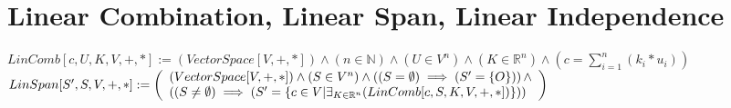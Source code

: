 \documentclass{book}
\newcommand{\abr}{:=}
\newcommand{\pipe}{$\phantom{(}\vrectangleblack\phantom{)}$}
\newcommand{\pr}[1]{\left(#1\right)}
\begin{document}
\begin{comment}
      \begin{enumerate}
        \lit $(a_1 \in A) \land (a_1 = -b_1 \in B)$ \pipe $a_1 \in A \cap B$ \pipe $a_1 = O = b_1$
        \lit $(a_2 \in A) \land (a_2 = -b_2 \in B)$ \pipe $a_2 \in A \cap B$ \pipe $a_2 = O = b_2$
        \lit $\langle a_1, b_1 \rangle = \langle O, O \rangle = \langle a_2, b_2 \rangle$
      \end{enumerate}
      \lit $\pr{(\langle a_1, b_1 \rangle, \langle a_2, b_2 \rangle \in A \times B) \land (O = a_1 + b_1) \land (O = a_2 + b_2)} \implies (\langle a_1, b_1 \rangle = \langle a_2, b_2 \rangle)$
      \lit $\forall_{\langle a_1, b_1 \rangle, \langle a_2, b_2 \rangle \in A \times B}\pr{\pr{(O = a_1 + b_1) \land (O = a_2 + b_2)} \implies (\langle a_1, b_1 \rangle = \langle a_2, b_2 \rangle)}$
      \lit $\pr{\exists_{\langle a, b \rangle \in A \times B}(O = a + b)} \land \pr{\forall_{\langle a_1, b_1 \rangle, \langle a_2, b_2 \rangle \in A \times B}\pr{\pr{(O = a_1 + b_1) \land (O = a_2 + b_2)} \implies (\langle a_1, b_1 \rangle = \langle a_2, b_2 \rangle)}}$
      \lit $\pr{\exists!_{\langle a, b \rangle \in A \times B}(O = a + b)} \land (DirSumEquiv)$ \pipe $DirSum[A \oplus B, A, B, V, +, *]$
    \end{enumerate}
    \lit $(A \cap B = \{O\}) \implies (DirSum[A \oplus B, A, B, V, +, *])$
    \lit $(DirSum[A \oplus B, A, B, V, +, *]) \iff (A \cap B = \{O\})$
  \end{enumerate} \vspace{.75mm} \hrule \vspace{.75mm} \ \\ 
\end{comment}

\section{Linear Combination, Linear Span, Linear Independence}
$LinComb[c, U, K, V, +, *] \abr (VectorSpace[V, +, *]) \land (n \in \mathbb{N}) \land (U \in V^n) \land (K \in \mathbb{R}^n) \land \pr{c = \sum_{i = 1}^{n}(k_i * u_i)}$ \\
$LinSpan[S', S, V, +, *] \abr \left(\begin{array}{ll}
  (VectorSpace[V, +, *]) \land (S \in V^n) \land \pr{(S = \emptyset) \implies (S' = \{O\})} \hfill \land \hfill \\
  \pr{(S \neq \emptyset) \implies \pr{S' = \{c \in V | \exists_{K \in \mathbb{R}^n}(LinComb[c, S, K, V, +, *])\}}}
\end{array}\right)$ \\
\end{document}
